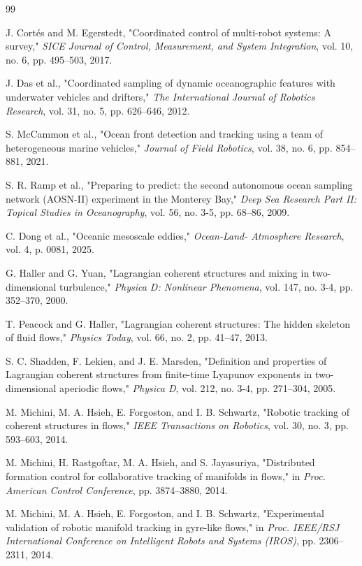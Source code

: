 \documentclass[lettersize,journal]{IEEEtran}
\begin{document}
\begin{thebibliography}{99}

 J. Cortés and M. Egerstedt, "Coordinated control of multi-robot
systems: A survey," \textit{SICE Journal of Control, Measurement, and
System Integration}, vol. 10, no. 6, pp. 495--503, 2017.

 J. Das et al., "Coordinated sampling of dynamic oceanographic
features with underwater vehicles and drifters," \textit{The International
Journal of Robotics Research}, vol. 31, no. 5, pp. 626--646, 2012.

 S. McCammon et al., "Ocean front detection and tracking using a
team of heterogeneous marine vehicles," \textit{Journal of Field Robotics},
vol. 38, no. 6, pp. 854--881, 2021.

 S. R. Ramp et al., "Preparing to predict: the second autonomous
ocean sampling network (AOSN-II) experiment in the Monterey Bay,"
\textit{Deep Sea Research Part II: Topical Studies in Oceanography}, vol. 56,
no. 3-5, pp. 68--86, 2009.

 C. Dong et al., "Oceanic mesoscale eddies," \textit{Ocean-Land-
Atmosphere Research}, vol. 4, p. 0081, 2025.

 G. Haller and G. Yuan, "Lagrangian coherent structures and mixing
in two-dimensional turbulence," \textit{Physica D: Nonlinear Phenomena},
vol. 147, no. 3-4, pp. 352--370, 2000.

 T. Peacock and G. Haller, "Lagrangian coherent structures: The
hidden skeleton of fluid flows," \textit{Physics Today}, vol. 66, no. 2,
pp. 41--47, 2013.

 S. C. Shadden, F. Lekien, and J. E. Marsden, "Definition and
properties of Lagrangian coherent structures from finite-time Lyapunov
exponents in two-dimensional aperiodic flows," \textit{Physica D}, vol. 212,
no. 3-4, pp. 271--304, 2005.

 M. Michini, M. A. Hsieh, E. Forgoston, and I. B. Schwartz,
"Robotic tracking of coherent structures in flows," \textit{IEEE Transactions
on Robotics}, vol. 30, no. 3, pp. 593--603, 2014.

 M. Michini, H. Rastgoftar, M. A. Hsieh, and S. Jayasuriya,
"Distributed formation control for collaborative tracking of manifolds in
flows," in \textit{Proc. American Control Conference}, pp. 3874--3880, 2014.

 M. Michini, M. A. Hsieh, E. Forgoston, and I. B. Schwartz,
"Experimental validation of robotic manifold tracking in gyre-like flows,"
in \textit{Proc. IEEE/RSJ International Conference on Intelligent Robots
and Systems (IROS)}, pp. 2306--2311, 2014.


\end{thebibliography}
\end{document}

